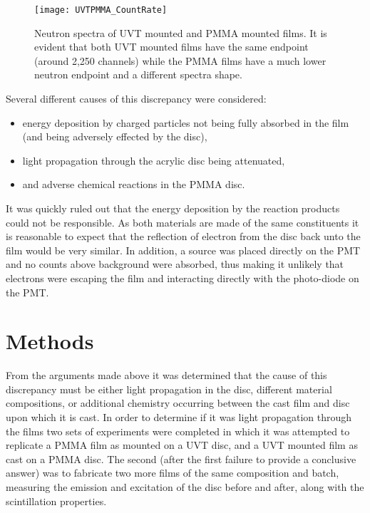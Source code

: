 \documentclass[draftcls,onecolumn]{IEEEtran}
\begin{document}
\begin{figure}
  \centering
  \texttt{[image: UVTPMMA\_CountRate]}
  \caption[Neutron Spectra of UVT mounted and PMMA mounted films]{Neutron spectra of UVT mounted and PMMA mounted films.  It is evident that both UVT mounted films have the same endpoint (around 2,250 channels) while the PMMA films have a much lower neutron endpoint and a different spectra shape.}
  \label{fig:NeutronCountRateRepeat}
\end{figure}
Several different causes of this discrepancy were considered:
\begin{itemize}
  \item energy deposition by charged particles not being fully absorbed in the film (and being adversely effected by the disc),
  \item light propagation through the acrylic disc being attenuated,
  \item and adverse chemical reactions in the PMMA disc.
\end{itemize}
It was quickly ruled out that the energy deposition by the reaction products could not be responsible.
As both materials are made of the same constituents it is reasonable to expect that the reflection of electron from the disc back unto the film would be very similar.
In addition, a  source was placed directly on the PMT and no counts above background were absorbed, thus making it unlikely that electrons were escaping the film and interacting directly with the photo-diode on the PMT.

\section{Methods}
From the arguments made above it was determined that the cause of this discrepancy must be either light propagation in the disc, different material compositions, or additional chemistry occurring between the cast film and disc upon which it is cast.
In order to determine if it was light propagation through the films two sets of experiments were completed in which it was attempted to replicate a PMMA film as mounted on a UVT disc, and a UVT mounted film as cast on a PMMA disc.
The second (after the first failure to provide a conclusive answer) was to fabricate two more films of the same composition and batch, measuring the emission and excitation of the disc before and after, along with the scintillation properties.
\end{document}
